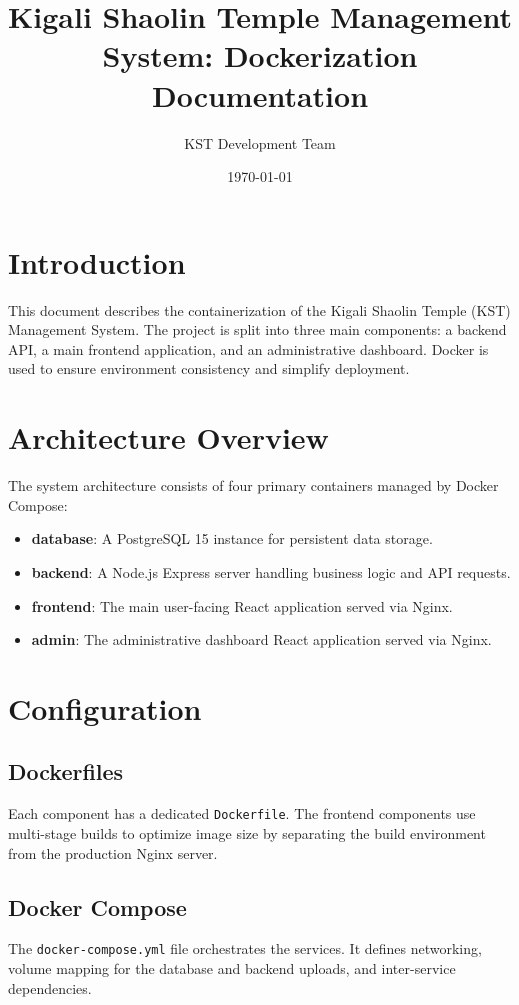 \documentclass{article}
\title{Kigali Shaolin Temple Management System: Dockerization Documentation}
\author{KST Development Team}
\date{\today}
\begin{document}
\maketitle

\section{Introduction}
This document describes the containerization of the Kigali Shaolin Temple (KST) Management System. The project is split into three main components: a backend API, a main frontend application, and an administrative dashboard. Docker is used to ensure environment consistency and simplify deployment.

\section{Architecture Overview}
The system architecture consists of four primary containers managed by Docker Compose:
\begin{itemize}
    \item \textbf{database}: A PostgreSQL 15 instance for persistent data storage.
    \item \textbf{backend}: A Node.js Express server handling business logic and API requests.
    \item \textbf{frontend}: The main user-facing React application served via Nginx.
    \item \textbf{admin}: The administrative dashboard React application served via Nginx.
\end{itemize}

\section{Configuration}

\subsection{Dockerfiles}
Each component has a dedicated \texttt{Dockerfile}. The frontend components use multi-stage builds to optimize image size by separating the build environment from the production Nginx server.

\subsection{Docker Compose}
The \texttt{docker-compose.yml} file orchestrates the services. It defines networking, volume mapping for the database and backend uploads, and inter-service dependencies.
\end{document}
